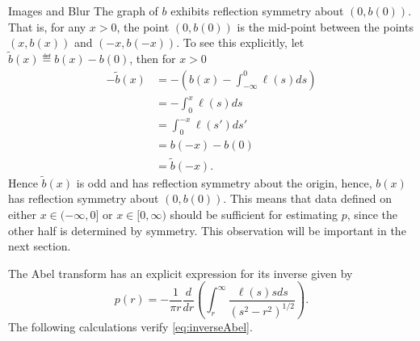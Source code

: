 \begin{chapter}{Images and Blur}
  The graph of $b$ exhibits reflection symmetry about $(0,b(0))$.
  That is, for any $x>0$, the point $(0,b(0))$ is the mid-point between the points $(x,b(x))$ and $(-x,b(-x))$. 
  To see this explicitly, let $\tilde b(x) \eqdef b(x) - b(0)$, then for $x>0$
  \begin{align}
    -\tilde b(x) &= -\left(b(x) - \int_{-\infty}^0 \ell(s)ds\right) \nonumber \\
      &= -\int_0^x \ell(s)ds \nonumber \\
      &= \int_0^{-x}\ell(s')ds'  \nonumber \\
      &= b(-x) - b(0) \nonumber\\
      &= \tilde b(-x).
  \end{align}
  Hence $\tilde b(x)$ is odd and has reflection symmetry about the origin, hence, $b(x)$ has reflection symmetry about $(0,b(0))$.
  This means that data defined on either $x\in(-\infty,0]$ or $x\in[0,\infty)$ should be sufficient for estimating $p$, since the other half is determined by symmetry.
  This observation will be important in the next section.

  The Abel transform has an explicit expression for its inverse \citep{epstein2008} given by
  \begin{equation} \label{eq:inverseAbel}
    p(r) = -\frac{1}{\pi r} \frac{d}{dr}\left(\int_r^\infty \frac{\ell(s) s ds}{ (s^2 - r^2)^{1/2} } \right).  
  \end{equation} 
  The following calculations verify \eqref{eq:inverseAbel}.


\end{chapter}
